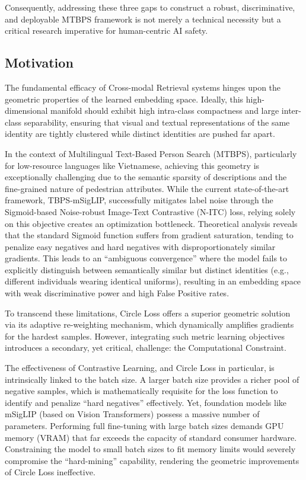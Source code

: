 \documentclass[../main.tex]{subfiles}
\begin{document}
\noindent Consequently, addressing these three gaps to construct a robust, discriminative, and deployable MTBPS framework is not merely a technical necessity but a critical research imperative for human-centric AI safety.

\subsection{Motivation}

The fundamental efficacy of Cross-modal Retrieval systems hinges upon the geometric properties of the learned embedding space. Ideally, this high-dimensional manifold should exhibit high intra-class compactness and large inter-class separability, ensuring that visual and textual representations of the same identity are tightly clustered while distinct identities are pushed far apart.

\noindent In the context of Multilingual Text-Based Person Search (MTBPS), particularly for low-resource languages like Vietnamese, achieving this geometry is exceptionally challenging due to the semantic sparsity of descriptions and the fine-grained nature of pedestrian attributes. While the current state-of-the-art framework, TBPS-mSigLIP, successfully mitigates label noise through the Sigmoid-based Noise-robust Image-Text Contrastive (N-ITC) loss, relying solely on this objective creates an optimization bottleneck. Theoretical analysis reveals that the standard Sigmoid function suffers from gradient saturation, tending to penalize easy negatives and hard negatives with disproportionately similar gradients. This leads to an ``ambiguous convergence'' where the model fails to explicitly distinguish between semantically similar but distinct identities (e.g., different individuals wearing identical uniforms), resulting in an embedding space with weak discriminative power and high False Positive rates.

\noindent To transcend these limitations, Circle Loss offers a superior geometric solution via its adaptive re-weighting mechanism, which dynamically amplifies gradients for the hardest samples. However, integrating such metric learning objectives introduces a secondary, yet critical, challenge: the Computational Constraint.

\noindent The effectiveness of Contrastive Learning, and Circle Loss in particular, is intrinsically linked to the batch size. A larger batch size provides a richer pool of negative samples, which is mathematically requisite for the loss function to identify and penalize ``hard negatives'' effectively. Yet, foundation models like mSigLIP (based on Vision Transformers) possess a massive number of parameters. Performing full fine-tuning with large batch sizes demands GPU memory (VRAM) that far exceeds the capacity of standard consumer hardware. Constraining the model to small batch sizes to fit memory limits would severely compromise the ``hard-mining'' capability, rendering the geometric improvements of Circle Loss ineffective.
\end{document}
